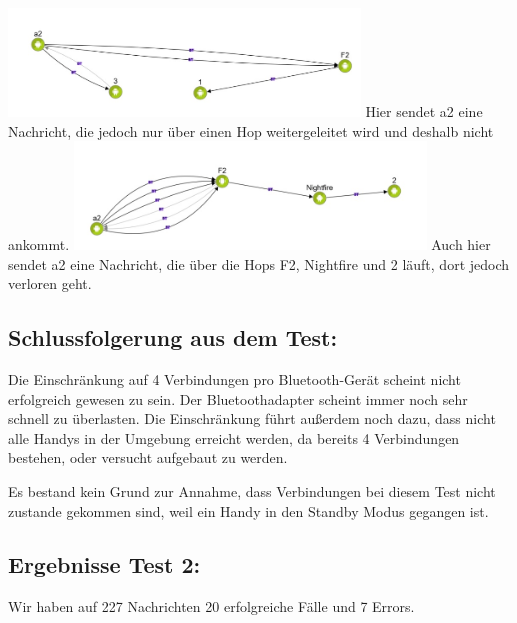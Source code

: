 \includegraphics[width=0.7\textwidth]{belege/grosstests/Bilder/Grosstest2/Test1Misserfolg1.jpg}
Hier sendet a2 eine Nachricht, die jedoch nur über einen Hop
weitergeleitet wird und deshalb nicht ankommt.
\includegraphics[width=0.7\textwidth]{belege/grosstests/Bilder/Grosstest2/Test1Misserfolg3.jpg}
Auch hier sendet a2 eine Nachricht, die über die Hops F2, Nightfire und
2 läuft, dort jedoch verloren geht.

\clearpage\subsection{Schlussfolgerung aus dem
Test:}\label{schlussfolgerung-aus-dem-test-2}

Die Einschränkung auf 4 Verbindungen pro Bluetooth-Gerät scheint nicht
erfolgreich gewesen zu sein. Der Bluetoothadapter scheint immer noch
sehr schnell zu überlasten. Die Einschränkung führt außerdem noch dazu,
dass nicht alle Handys in der Umgebung erreicht werden, da bereits 4
Verbindungen bestehen, oder versucht aufgebaut zu werden.

Es bestand kein Grund zur Annahme, dass Verbindungen bei diesem Test
nicht zustande gekommen sind, weil ein Handy in den Standby Modus
gegangen ist.

\clearpage\subsection{Ergebnisse Test 2:}\label{ergebnisse-test-2-1}

Wir haben auf 227 Nachrichten 20 erfolgreiche Fälle und 7 Errors.

